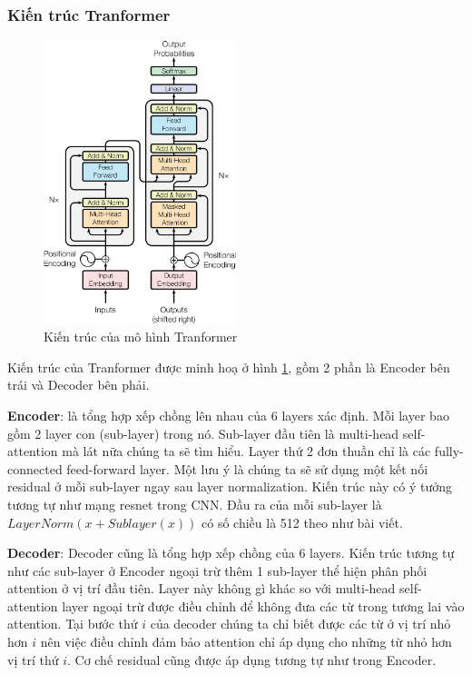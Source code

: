 \subsubsection{Kiến trúc Tranformer}
\begin{figure}[htb]
    \centering
    \includegraphics[width=0.5\textwidth]{image/tranformer-architecture.png}
    \caption[Kiến trúc của mô hình Tranformer]{Kiến trúc của mô hình Tranformer \cite{vaswani2023attentionneed}}
    \label{figure:tranformer-architecture}
\end{figure}

Kiến trúc của Tranformer được minh hoạ ở hình \ref{figure:tranformer-architecture}, gồm 2 phần là Encoder bên trái và Decoder bên phải\cite{webpage23}.

\textbf{Encoder}: là tổng hợp xếp chồng lên nhau của 6 layers xác định. Mỗi layer bao gồm 2 layer con (sub-layer) trong nó. Sub-layer đầu tiên là multi-head self-attention mà lát nữa chúng ta sẽ tìm hiểu. Layer thứ 2 đơn thuần chỉ là các fully-connected feed-forward layer. Một lưu ý là chúng ta sẽ sử dụng một kết nối residual ở mỗi sub-layer ngay sau layer normalization. Kiến trúc này có ý tưởng tương tự như mạng resnet trong CNN. Đầu ra của mỗi sub-layer là $LayerNorm(x+Sublayer(x))$ có số chiều là 512 theo như bài viết.

\textbf{Decoder}: Decoder cũng là tổng hợp xếp chồng của 6 layers. Kiến trúc tương tự như các sub-layer ở Encoder ngoại trừ thêm 1 sub-layer thể hiện phân phối attention ở vị trí đầu tiên. Layer này không gì khác so với multi-head self-attention layer ngoại trừ được điều chỉnh để không đưa các từ trong tương lai vào attention. Tại bước thứ $i$ của decoder chúng ta chỉ biết được các từ ở vị trí nhỏ hơn $i$ nên việc điều chỉnh đảm bảo attention chỉ áp dụng cho những từ nhỏ hơn vị trí thứ $i$. Cơ chế residual cũng được áp dụng tương tự như trong Encoder.

